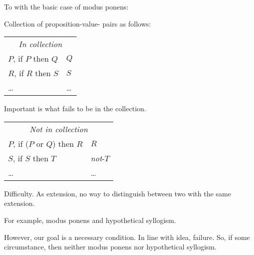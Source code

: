 \begin{note}
  To  with the basic case of modus ponens:

  \begin{illustration}
    Collection of proposition-value-\poP{} pairs as follows:

    \begin{center}
      \begin{tabular}[h]{p{.55\linewidth}|p{.4\linewidth}}
        \multicolumn{2}{c}{\emph{In collection}} \\
        \(P\), if \(P\) then \(Q\) & \(Q\) \\
        \(R\), if \(R\) then \(S\) & \(S\) \\
        \dots & \dots \\
      \end{tabular}
    \end{center}

    Important is what fails to be in the collection.

    \begin{center}
      \begin{tabular}[h]{p{.55\linewidth}|p{.4\linewidth}}
        \multicolumn{2}{c}{\emph{Not in collection}} \\
        \(P\), if (\(P\text{ or }Q\)) then \(R\) & \(R\) \\
        \(S\), if \(S\) then \(T\) & \emph{not}-\(T\) \\
        \dots & \dots \\
      \end{tabular}
    \end{center}
  \end{illustration}
\end{note}

\begin{note}
  Difficulty.
  As extension, no way to distinguish between two  with the same extension.

  For example, modus ponens and hypothetical syllogism.

  However, our goal is a necessary condition.
  In line with idea, failure.
  So, if some circumstance, then neither modus ponens nor hypothetical syllogism.
\end{note}


